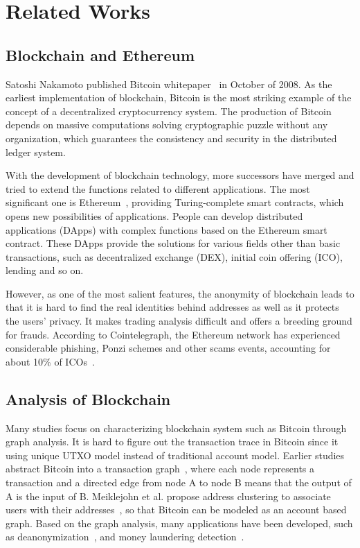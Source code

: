 
\section{Related Works}
\subsection{Blockchain and Ethereum}
Satoshi Nakamoto published Bitcoin whitepaper~\cite{Nakamoto2008} in October of 2008. As the earliest implementation of blockchain, Bitcoin is the most striking example of the concept of a decentralized cryptocurrency system. The production of Bitcoin depends on massive computations solving cryptographic puzzle without any organization, which guarantees the consistency and security in the distributed ledger system.

With the development of blockchain technology, more successors have merged and tried to extend the functions related to different applications. The most significant one is Ethereum~\cite{buterin2013ethereum}, providing Turing-complete smart contracts, which opens new possibilities of applications. People can develop distributed applications (DApps) with complex functions based on the Ethereum smart contract. These DApps provide the solutions for various fields other than basic transactions, such as decentralized exchange (DEX), initial coin offering (ICO), lending and so on.

However, as one of the most salient features, the anonymity of blockchain leads to that it is hard to find the real identities behind addresses as well as it protects the users' privacy. It makes trading analysis difficult and offers a breeding ground for frauds. According to Cointelegraph, the Ethereum network has experienced considerable phishing, Ponzi schemes and other scams events, accounting for about 10\% of ICOs~\cite{cerchiello2018icos}.
\subsection{Analysis of Blockchain}
Many studies focus on characterizing blockchain system such as Bitcoin through graph analysis. It is hard to figure out the transaction trace in Bitcoin since it using unique UTXO model instead of traditional account model. Earlier studies abstract Bitcoin into a transaction graph~\cite{reid2013analysis}, where each node represents a transaction and a directed edge from node A to node B means that the output of A is the input of B. Meiklejohn et al. propose address clustering to associate users with their addresses~\cite{meiklejohn2013fistful}, so that Bitcoin can be modeled as an account based graph. Based on the graph analysis, many applications have been developed, such as deanonymization~\cite{reid2013analysis}, and money laundering detection~\cite{zhao2015graph,maesa2016analysis,ranshous2017exchange}. 

